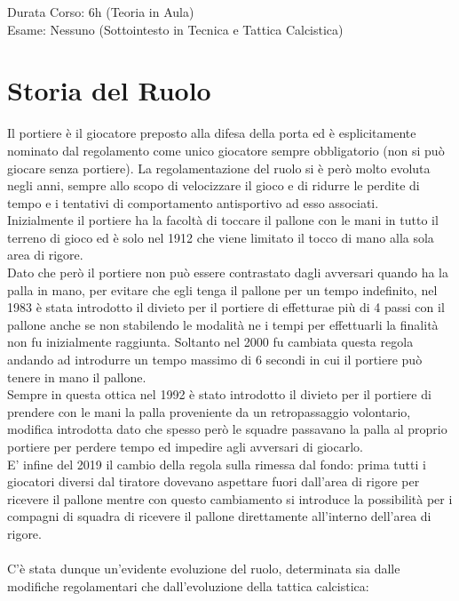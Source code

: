 \documentclass[../uefaC.tex]{subfiles}
\begin{document}

Durata Corso: 6h (Teoria in Aula) \hfill \\
Esame: Nessuno (Sottointesto in Tecnica e Tattica Calcistica)

\section{Storia del Ruolo}
Il portiere è il giocatore preposto alla difesa della porta ed è esplicitamente nominato dal regolamento come unico giocatore sempre obbligatorio (non si può giocare senza portiere). La regolamentazione del ruolo si è però molto evoluta negli anni, sempre allo scopo di velocizzare il gioco e di ridurre le perdite di tempo e i tentativi di comportamento antisportivo ad esso associati. \hfill \\
Inizialmente il portiere ha la facoltà di toccare il pallone con le mani in tutto il terreno di gioco ed è solo nel 1912 che viene limitato il tocco di mano alla sola area di rigore. \hfill \\
Dato che però il portiere non può essere contrastato dagli avversari quando ha la palla in mano, per evitare che egli tenga il pallone per un tempo indefinito, nel 1983 è stata introdotto il divieto per il portiere di effetturae più di 4 passi con il pallone anche se non stabilendo le modalità ne i tempi per effettuarli la finalità non fu inizialmente raggiunta. Soltanto nel 2000 fu cambiata questa regola andando ad introdurre un tempo massimo di $6$ secondi in cui il portiere può tenere in mano il pallone. \hfill \\
Sempre in questa ottica nel 1992 è stato introdotto il divieto per il portiere di prendere con le mani la palla proveniente da un retropassaggio volontario, modifica introdotta dato che spesso però le squadre passavano la palla al proprio portiere per perdere tempo ed impedire agli avversari di giocarlo. \hfill \\
E' infine del 2019 il cambio della regola sulla rimessa dal fondo: prima tutti i giocatori diversi dal tiratore dovevano aspettare fuori dall'area di rigore per ricevere il pallone mentre con questo cambiamento si introduce la possibilità per i compagni di squadra di ricevere il pallone direttamente all'interno dell'area di rigore. \hfill \\ 
\hfill \\
C'è stata dunque un'evidente evoluzione del ruolo, determinata sia dalle modifiche regolamentari che dall'evoluzione della tattica calcistica:
\end{document}

